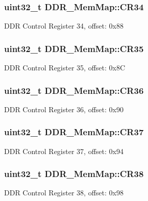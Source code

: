 \subsubsection[{C\+R34}]{\setlength{\rightskip}{0pt plus 5cm}uint32\+\_\+t D\+D\+R\+\_\+\+Mem\+Map\+::\+C\+R34}\label{struct_d_d_r___mem_map_a71d3b5c9058043fba985cb2d4553af1b}
D\+D\+R Control Register 34, offset\+: 0x88 \hypertarget{struct_d_d_r___mem_map_aec2f8c0be0d4ad9d0a2f66c552f7c0b9}{}
\subsubsection[{C\+R35}]{\setlength{\rightskip}{0pt plus 5cm}uint32\+\_\+t D\+D\+R\+\_\+\+Mem\+Map\+::\+C\+R35}\label{struct_d_d_r___mem_map_aec2f8c0be0d4ad9d0a2f66c552f7c0b9}
D\+D\+R Control Register 35, offset\+: 0x8\+C \hypertarget{struct_d_d_r___mem_map_a608779093b536cc0655b2624711e873d}{}
\subsubsection[{C\+R36}]{\setlength{\rightskip}{0pt plus 5cm}uint32\+\_\+t D\+D\+R\+\_\+\+Mem\+Map\+::\+C\+R36}\label{struct_d_d_r___mem_map_a608779093b536cc0655b2624711e873d}
D\+D\+R Control Register 36, offset\+: 0x90 \hypertarget{struct_d_d_r___mem_map_a2212e1defac52c5c70f3d9f3fd04cd23}{}
\subsubsection[{C\+R37}]{\setlength{\rightskip}{0pt plus 5cm}uint32\+\_\+t D\+D\+R\+\_\+\+Mem\+Map\+::\+C\+R37}\label{struct_d_d_r___mem_map_a2212e1defac52c5c70f3d9f3fd04cd23}
D\+D\+R Control Register 37, offset\+: 0x94 \hypertarget{struct_d_d_r___mem_map_ab86d1428f3aea3b06a503119a630d2c7}{}
\subsubsection[{C\+R38}]{\setlength{\rightskip}{0pt plus 5cm}uint32\+\_\+t D\+D\+R\+\_\+\+Mem\+Map\+::\+C\+R38}\label{struct_d_d_r___mem_map_ab86d1428f3aea3b06a503119a630d2c7}
D\+D\+R Control Register 38, offset\+: 0x98 \hypertarget{struct_d_d_r___mem_map_aebfebf464f9aa9fb6f7e67f96a972eb8}{}
